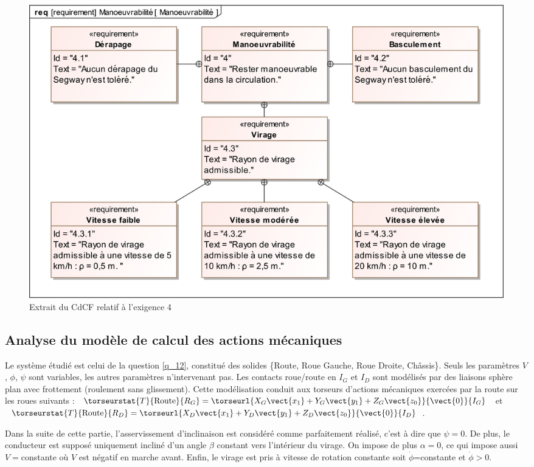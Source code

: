 \documentclass[10pt,fleqn]{article} %
\begin{document}
\begin{figure}[H]
\centering
\includegraphics[width=0.9\linewidth]{req_04}
\caption{Extrait du CdCF relatif à l'exigence 4 \label{req_04} }%
\end{figure}

\fi

\subsection{Analyse du modèle de calcul des actions mécaniques \label{sec:A}}

\ifprof
\else

Le système étudié est celui de la question \ref{q_12}, constitué des solides \{Route, Roue Gauche, Roue Droite, Châssis\}. Seuls les paramètres $V$, $\phi$, $\psi$ sont variables, les autres paramètres n’intervenant pas. Les contacts roue/route en $I_G$ et $I_D$ sont modélisés par des liaisons sphère plan avec frottement (roulement sans glissement). Cette modélisation conduit aux torseurs d’actions mécaniques exercées par la route sur les roues suivants :
$\torseurstat{T}{\text{Route}}{R_{G}} = \torseurl{X_G\vect{x_1}+Y_G\vect{y_1}+Z_G\vect{z_0}}{\vect{0}}{I_G}$
  et  
$\torseurstat{T}{\text{Route}}{R_{D}} = \torseurl{X_D\vect{x_1}+Y_D\vect{y_1}+Z_D\vect{z_0}}{\vect{0}}{I_D}$.



Dans la suite de cette partie, l’asservissement d’inclinaison est considéré comme parfaitement réalisé, c’est à dire que $\psi = 0$. De plus, le conducteur est supposé uniquement incliné d’un angle $\beta$ constant vers l’intérieur du virage. On impose de plus $\alpha=0$, ce qui impose aussi  $V=$constante où $V$ est négatif en marche avant. Enfin, le virage est pris à vitesse de rotation constante soit $\dot{\phi}$=constante et $\dot{\phi}>0$.
\end{document}

